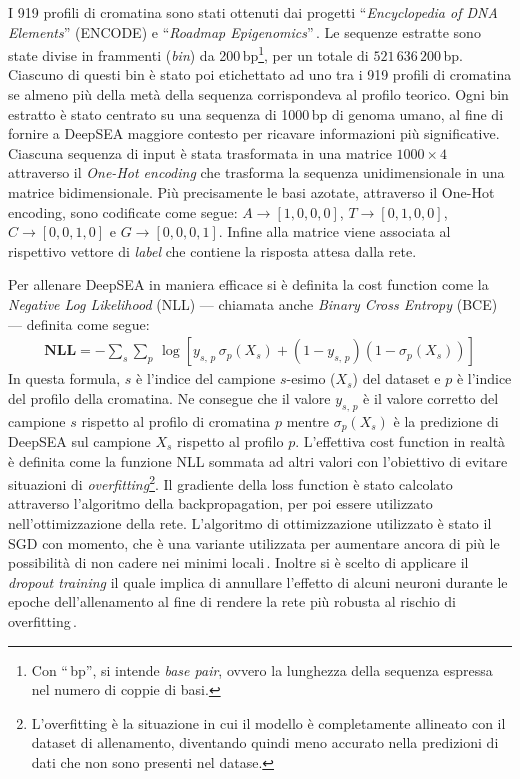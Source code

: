 I 919 profili di cromatina sono stati ottenuti dai progetti ``\textit{Encyclopedia of \acs{DNA} Elements}'' (\acs{ENCODE}) e ``\textit{Roadmap Epigenomics}''\,\cite{encodeproject, roadmapepigenomics}. Le sequenze estratte sono state divise in frammenti (\textit{bin}) da 200\,bp\footnote{Con ``\,bp'', si intende \textit{base pair}, ovvero la lunghezza della sequenza espressa nel numero di coppie di basi.}, per un totale di $521\,636\,200$\,bp. Ciascuno di questi bin è stato poi etichettato ad uno tra i 919 profili di cromatina se almeno più della metà della sequenza corrispondeva al profilo teorico. Ogni bin estratto è stato centrato su una sequenza di 1000\,bp di genoma umano, al fine di fornire a DeepSEA maggiore contesto per ricavare informazioni più significative. Ciascuna sequenza di input è stata trasformata in una matrice $1000\times 4$ attraverso il \textit{One-Hot encoding} che trasforma la sequenza unidimensionale in una matrice bidimensionale. Più precisamente le basi azotate, attraverso il One-Hot encoding, sono codificate come segue: $A \to \left[1, 0, 0, 0\right]$, $T \to \left[0, 1, 0, 0\right]$, $C \to \left[0, 0, 1, 0\right]$ e $G \to \left[0, 0, 0, 1\right]$. Infine alla matrice viene associata al rispettivo vettore di \textit{label} che contiene la risposta attesa dalla rete.

Per allenare DeepSEA in maniera efficace si è definita la cost function come la \textit{Negative Log Likelihood} (\acs{NLL}) — chiamata anche \textit{Binary Cross Entropy} (\acs{BCE}) — definita come segue:
% 
\begin{gather*}
    \mathbf{NLL} = - \sum_s \sum_p\, \log\left[ y_{s,\,p}\,\sigma_p\left(X_s\right)  + \left( 1- y_{s,\,p} \right)\left(1 - \sigma_p\left(X_s\right) \right) \right]
\end{gather*}
% 
\noindent In questa formula, $s$ è l'indice del campione $s$-esimo ($X_s$) del dataset e $p$ è l'indice del profilo della cromatina. Ne consegue che il valore $y_{s,\,p}$ è il valore corretto del campione $s$ rispetto al profilo di cromatina $p$ mentre $\sigma_p\left(X_s\right)$ è la predizione di DeepSEA sul campione $X_s$ rispetto al profilo $p$. L'effettiva cost function in realtà è definita come la funzione \acs{NLL} sommata ad altri valori con l'obiettivo di evitare situazioni di \textit{overfitting}\footnote{L'overfitting è la situazione in cui il modello è completamente allineato con il dataset di allenamento, diventando quindi meno accurato nella predizioni di dati che non sono presenti nel datase.}. Il gradiente della loss function è stato calcolato attraverso l'algoritmo della backpropagation, per poi essere utilizzato nell'ottimizzazione della rete. L'algoritmo di ottimizzazione utilizzato è stato il \acs{SGD} con momento, che è una variante utilizzata per aumentare ancora di più le possibilità di non cadere nei minimi locali\,\cite{aggarwal2018neural}. Inoltre si è scelto di applicare il \textit{dropout training} il quale implica di annullare l'effetto di alcuni neuroni durante le epoche dell'allenamento al fine di rendere la rete più robusta al rischio di overfitting\,\cite{nielsen2015neural}.

